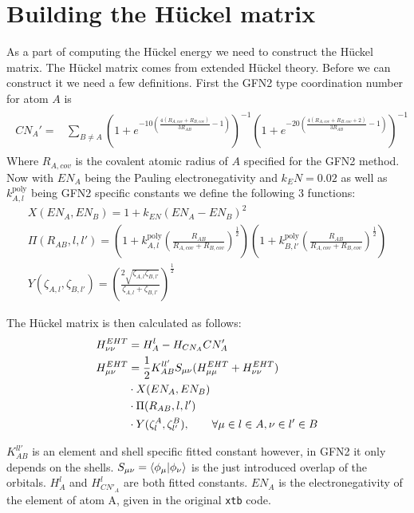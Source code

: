 \section{Building the Hückel matrix}
As a part of computing the Hückel energy we need to construct the Hückel matrix.
The Hückel matrix comes from extended Hückel theory. Before we can construct it we need a few definitions. 
First the GFN2 type coordination number for atom $A$ is
\begin{gather}
    \begin{split}
        CN_A' = &\sum_{B\neq A}\left(1+e^{-10\left(\frac{4\left(R_{A,cov}+R_{B,cov}\right)}{3R_{AB}}-1\right)}\right)^{-1}\left(1+e^{-20\left(\frac{4\left(R_{A,cov}+R_{B,cov}+2\right)}{3R_{AB}}-1\right)}\right)^{-1}
    \end{split}
\end{gather}
Where $R_{A,cov}$ is the covalent atomic radius of $A$ specified for the GFN2 method.
Now with $EN_A$ being the Pauling electronegativity and $k_EN=0.02$ as well as $k_{A,l}^{\text{poly}}$ being GFN2 specific constants we define the following 3 functions:
\begin{gather}
    X(EN_A,EN_B) = 1 + k_{EN}(EN_A-EN_B)^2\\
    \Pi(R_{AB},l,l') = \left(1 + k^{\text{poly}}_{A,l}\left(\frac{R_{AB}}{R_{A,cov}+R_{B,cov}}\right)^\frac{1}{2}\right)\left(1 + k^{\text{poly}}_{B,l'}\left(\frac{R_{AB}}{R_{A,cov}+R_{B,cov}}\right)^\frac{1}{2}\right)\\
    Y(\zeta_{A,l},\zeta_{B,l'}) = \left(\frac{2\sqrt{\zeta_{A,l}\zeta_{B,l'}}}{\zeta_{A,l}+\zeta_{B,l'}}\right)^\frac{1}{2}
\end{gather}

The Hückel matrix is then calculated as follows:
\begin{align}
    H_{\nu\nu}^{EHT} &= H_A^l - H_{CN_A}CN_A'\\
    H^{EHT}_{\mu\nu} &= \frac{1}{2}K^{ll'}_{AB}S_{\mu\nu}(H^{EHT}_{\mu\mu}+H^{EHT}_{\nu\nu})\\
    &\cdot X(EN_A,EN_B)\notag\\
    &\cdot \Pi(R_{AB},l,l')\notag\\
    &\cdot Y(\zeta^A_l,\zeta^B_{l'}), \quad\quad \forall \mu \in l \in A, \nu \in l' \in B\notag
\end{align}

$K^{ll'}_{AB}$ is an element and shell specific fitted constant however, in GFN2 it only depends on the shells. 
$S_{\mu\nu}=\braket{\phi_\mu|\phi_\nu}$ is the just introduced overlap of the orbitals. 
$H^l_A$ and $H^l_{CN'_A}$ are both fitted constants. $EN_A$ is the electronegativity of the element of atom A, given in the original \texttt{xtb} code. 

